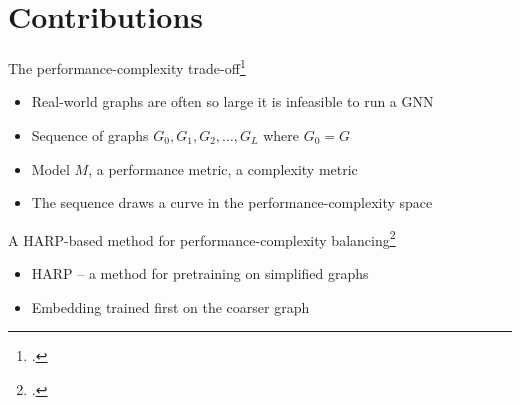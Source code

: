 \documentclass[10pt]{beamer}
\begin{document}
\section{Contributions}

\begin{frame}{The performance-complexity trade-off\footcite{prochazka_scalable_2022, dedic_balancing_2023, dedic_balancing_2024}}
	\begin{itemize}
		\item<1-> Real-world graphs are often so large it is infeasible to run a GNN
		\item<2-> Sequence of graphs \( G_0, G_1, G_2, \dots, G_L \) where \( G_0 = G \)
		\item<3-> Model \( M \), a performance metric, a complexity metric
		\item<4-> The sequence draws a curve in the performance-complexity space
	\end{itemize}

	\vfill

	\centering
\end{frame}

\begin{frame}{A HARP-based method for performance-complexity balancing\footcite{dedic_balancing_2024}}
	\begin{itemize}
		\item<1-> HARP -- a method for pretraining on simplified graphs
		\item<2-> Embedding trained first on the coarser graph
	\end{itemize}

	\vfill

	\centering
\end{frame}
\end{document}
